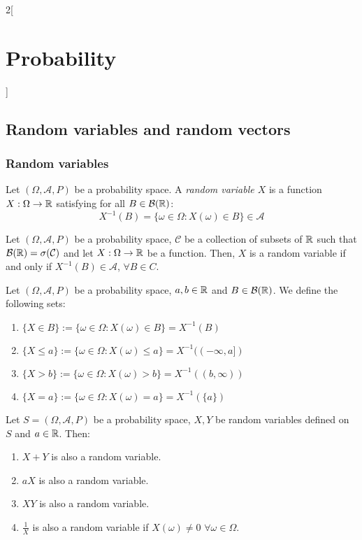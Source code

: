 \documentclass[../../../main.tex]{subfiles}
\begin{document}
\begin{multicols}{2}[\section{Probability}]
  \subsection{Random variables and random vectors}
  \subsubsection*{Random variables}
  \begin{definition}
    Let $(\Omega,\mathcal{A},P)$ be a probability space. A \textit{random variable $X$} is a function $X:\Omega\rightarrow\mathbb{R}$ satisfying for all $B\in\mathcal{B}(\mathbb{R})$: $$X^{-1}(B)=\{\omega\in\Omega:X(\omega)\in B\}\in\mathcal{A}$$
  \end{definition}
  \begin{prop}
    Let $(\Omega,\mathcal{A},P)$ be a probability space, $\mathcal{C}$ be a collection of subsets of $\mathbb{R}$ such that $\mathcal{B}(\mathbb{R})=\sigma(\mathcal{C})$ and let $X:\Omega\rightarrow\mathbb{R}$ be a function. Then, $X$ is a random variable if and only if $X^{-1}(B)\in\mathcal{A}$, $\forall B\in C$.
  \end{prop}
  \begin{definition}
    Let $(\Omega,\mathcal{A},P)$ be a probability space, $a,b\in\mathbb{R}$ and $B\in\mathcal{B}(\mathbb{R})$. We define the following sets:
    \begin{enumerate}
      \item $\displaystyle\{X\in B\}:=\{\omega\in\Omega:X(\omega)\in B\}=X^{-1}(B)$
      \item $\displaystyle\{X\leq a\}:=\{\omega\in\Omega:X(\omega)\leq a\}=X^{-1}((-\infty,a])$
      \item $\displaystyle\{X> b\}:=\{\omega\in\Omega:X(\omega)>b\}=X^{-1}((b,\infty))$
      \item $\displaystyle\{X=a\}:=\{\omega\in\Omega:X(\omega)=a\}=X^{-1}(\{a\})$
    \end{enumerate}
  \end{definition}
  \begin{prop}
    Let $S=(\Omega,\mathcal{A},P)$ be a probability space, $X,Y$ be random variables defined on $S$ and $a\in\mathbb{R}$. Then:
    \begin{enumerate}
      \item $X+Y$ is also a random variable.
      \item $aX$ is also a random variable.
      \item $XY$ is also a random variable.
      \item $\frac{1}{X}$ is also a random variable if $X(\omega)\ne 0$ $\forall \omega\in\Omega$.

\end{enumerate}
\end{prop}
\end{multicols}
\end{document}
